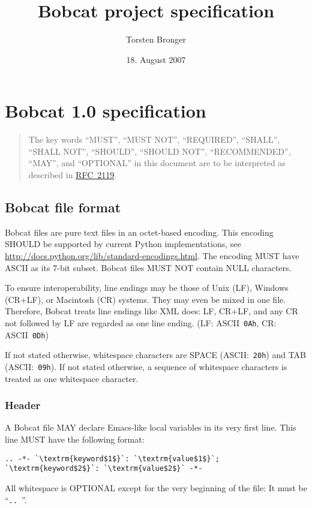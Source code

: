 \documentclass[12pt,openany]{book}
\begin{document}
\title{Bobcat project specification}
\author{Torsten Bronger}
\date{18. August 2007}
\maketitle

\tableofcontents

\chapter{Bobcat 1.0 specification}

\begin{quotation}
  The key words ``MUST'', ``MUST NOT'', ``REQUIRED'', ``SHALL'', ``SHALL NOT'',
  ``SHOULD'', ``SHOULD NOT'', ``RECOMMENDED'', ``MAY'', and ``OPTIONAL'' in
  this document are to be interpreted as described in
  \href{http://tools.ietf.org/html/rfc2119}{RFC~2119}.
\end{quotation}
      
\section{Bobcat file format}

Bobcat files are pure text files in an octet-based encoding.  This encoding
SHOULD be supported by current Python implementations, see
\url{http://docs.python.org/lib/standard-encodings.html}.  The encoding MUST
have ASCII as its \mbox{7-bit} subset.  Bobcat files MUST NOT contain NULL
characters.

To ensure interoperability, line endings may be those of Unix (LF), Windows
(CR+LF), or Macintosh (CR) systems.  They may even be mixed in one file.
Therefore, Bobcat treats line endings like XML does: LF, CR+LF, and any CR not
followed by LF are regarded as one line ending.  (LF: ASCII~\verb|0Ah|, CR:
ASCII~\verb|0Dh|)

If not stated otherwise, whitespace characters are SPACE (ASCII:~\verb|20h|)
and TAB (ASCII:~\verb|09h|).  If not stated otherwise, a sequence of whitespace
characters is treated as one whitespace character.

\subsection{Header}

A Bobcat file MAY declare Emacs-like local variables in its very first line.
This line MUST have the following format:
\begin{lstlisting}[escapechar=`]
.. -*- `\textrm{keyword$1$}`: `\textrm{value$1$}`; `\textrm{keyword$2$}`: `\textrm{value$2$}` -*-
\end{lstlisting}
All whitespace is OPTIONAL except for the very beginning of the file: It must
be ``\verb*|.. |''.
\end{document}
